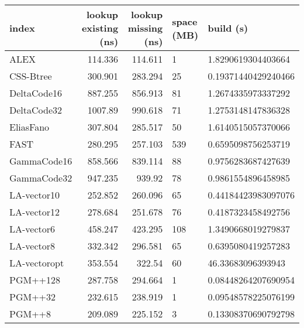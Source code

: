 \begin{tabular}{lrrll}
\hline
 index             &   lookup existing (ns) &   lookup missing (ns) & space (MB)   & build (s)             \\
\hline
 ALEX              &               114.336  &              114.611  & 1            & 1.8290619304403664    \\
 CSS-Btree         &               300.901  &              283.294  & 25           & 0.19371440429240466   \\
 DeltaCode16       &               887.255  &              856.913  & 81           & 1.2674335973337292    \\
 DeltaCode32       &              1007.89   &              990.618  & 71           & 1.2753148147836328    \\
 EliasFano         &               307.804  &              285.517  & 50           & 1.6140515057370066    \\
 FAST              &               280.295  &              257.103  & 539          & 0.6595098756253719    \\
 GammaCode16       &               858.566  &              839.114  & 88           & 0.9756283687427639    \\
 GammaCode32       &               947.235  &              939.92   & 78           & 0.9861554896458985    \\
 LA-vector10       &               252.852  &              260.096  & 65           & 0.44184423983097076   \\
 LA-vector12       &               278.684  &              251.678  & 76           & 0.4187323458492756    \\
 LA-vector6        &               458.247  &              423.295  & 108          & 1.3490668019279837    \\
 LA-vector8        &               332.342  &              296.581  & 65           & 0.6395080419257283    \\
 LA-vectoropt      &               353.554  &              322.54   & 60           & 46.33683096393943     \\
 PGM++128          &               287.758  &              294.664  & 1            & 0.08448264207690954   \\
 PGM++32           &               232.615  &              238.919  & 1            & 0.09548578225076199   \\
 PGM++8            &               209.089  &              225.152  & 3            & 0.13308370690792798   \\

\end{tabular}
